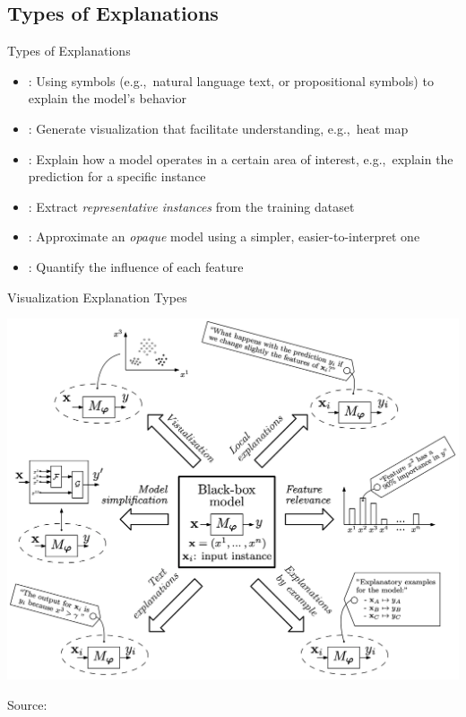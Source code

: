 \documentclass[11pt,dvipsnames,usenames,aspectratio=169]{beamer}  %
\begin{document}
\subsection{Types of Explanations}
\begin{frame}{Types of Explanations}{}
  {\small
    \begin{itemize}[<+->]
      \setlength{\itemsep}{14pt}
      \item \textbf{}: Using symbols (e.g.,~natural language text, or propositional symbols) to explain the model's behavior
      \item \textbf{}: Generate visualization that facilitate understanding, e.g.,~heat map
      \item \textbf{}: Explain how a model operates in a certain area of interest, e.g.,~explain the prediction for a specific instance
      \item \textbf{}: Extract \textit{representative instances} from the training dataset
      \item \textbf{}: Approximate an \textit{opaque} model using a simpler, easier-to-interpret one
      \item \textbf{}: Quantify the influence of each feature
    \end{itemize}
  }
\end{frame}

\begin{frame}{Visualization Explanation Types}
  \begin{center}
    \includegraphics[scale=0.177]{visual_representation_explanation_types.png}
  \end{center}
  \begin{flushright}
    {\vspace{-16pt} \tiny Source:~\citet{Arrieta:2020}}
  \end{flushright}
\end{frame}
\end{document}
